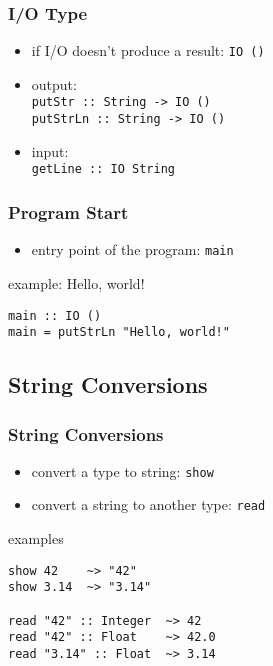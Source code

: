 \documentclass[dvipsnames]{beamer}
\theoremstyle{plain}
\begin{document}
\begin{frame}
  \frametitle{I/O Type}

  \begin{itemize}
    \item if I/O doesn't produce a result: \lstinline{IO ()}

    \medskip
    \item output:\\
      \smallskip
      \lstinline{putStr :: String -> IO ()}\\
      \lstinline{putStrLn :: String -> IO ()}

    \smallskip
    \item input:\\
      \smallskip
      \lstinline{getLine :: IO String}\\
  \end{itemize}
\end{frame}

\begin{frame}[fragile]
  \frametitle{Program Start}

  \begin{itemize}
    \item entry point of the program: \lstinline{main}
  \end{itemize}

  \medskip
  \begin{exampleblock}{example: Hello, world!}
    \begin{lstlisting}
main :: IO ()
main = putStrLn "Hello, world!"
    \end{lstlisting}
  \end{exampleblock}
\end{frame}

\subsection{String Conversions}

\begin{frame}[fragile]
  \frametitle{String Conversions}

  \begin{itemize}
    \item convert a type to string: \lstinline{show}
    \item convert a string to another type: \lstinline{read}
  \end{itemize}

  \begin{exampleblock}{examples}
    \begin{lstlisting}
show 42    ~> "42"
show 3.14  ~> "3.14"

read "42" :: Integer  ~> 42
read "42" :: Float    ~> 42.0
read "3.14" :: Float  ~> 3.14
    \end{lstlisting}
  \end{exampleblock}
\end{frame}
\end{document}

